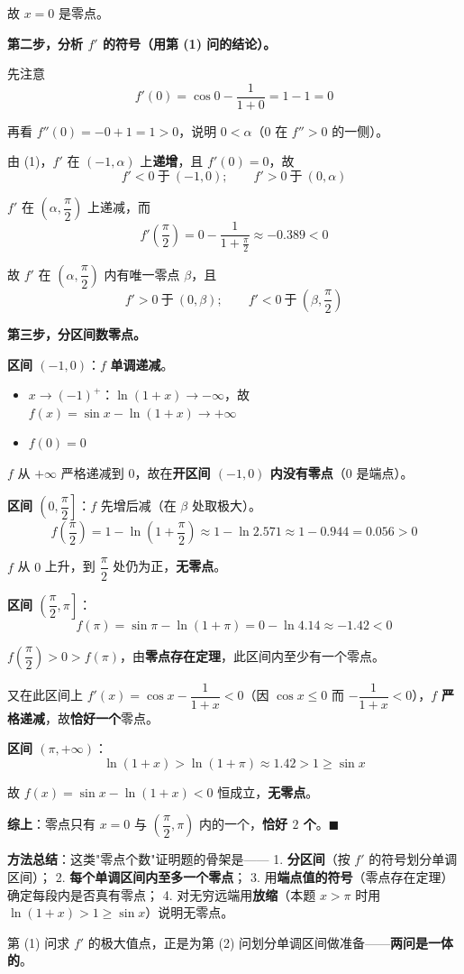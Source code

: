 故 $x=0$ 是零点。

\textbf{第二步，分析 $f'$ 的符号（用第 (1) 问的结论）。}

先注意
\[f'(0)=\cos0-\frac1{1+0}=1-1=0\]

再看 $f''(0)=-0+1=1>0$，说明 $0<\alpha$（$0$ 在 $f''>0$ 的一侧）。

由 (1)，$f'$ 在 $(-1,\alpha)$ 上\textbf{递增}，且 $f'(0)=0$，故
\[f'<0\ \text{于}\ (-1,0);\qquad f'>0\ \text{于}\ (0,\alpha)\]

$f'$ 在 $\left(\alpha,\dfrac\pi2\right)$ 上递减，而
\[f'\left(\frac\pi2\right)=0-\frac1{1+\frac\pi2}\approx-0.389<0\]

故 $f'$ 在 $\left(\alpha,\dfrac\pi2\right)$ 内有唯一零点 $\beta$，且
\[f'>0\ \text{于}\ (0,\beta);\qquad f'<0\ \text{于}\ \left(\beta,\frac\pi2\right)\]

\textbf{第三步，分区间数零点。}

\textbf{区间 $(-1,0)$}：$f$ \textbf{单调递减}。
\begin{itemize}
\item $x\to(-1)^{+}$：$\ln(1+x)\to-\infty$，故 $f(x)=\sin x-\ln(1+x)\to+\infty$
\item $f(0)=0$
\end{itemize}

$f$ 从 $+\infty$ 严格递减到 $0$，故在\textbf{开区间 $(-1,0)$ 内没有零点}（$0$ 是端点）。

\textbf{区间 $\left(0,\dfrac\pi2\right]$}：$f$ 先增后减（在 $\beta$ 处取极大）。
\[f\left(\frac\pi2\right)=1-\ln\left(1+\frac\pi2\right)\approx1-\ln2.571\approx1-0.944=0.056>0\]

$f$ 从 $0$ 上升，到 $\dfrac\pi2$ 处仍为正，\textbf{无零点}。

\textbf{区间 $\left(\dfrac\pi2,\pi\right]$}：
\[f(\pi)=\sin\pi-\ln(1+\pi)=0-\ln4.14\approx-1.42<0\]

$f\left(\dfrac\pi2\right)>0>f(\pi)$，由\textbf{零点存在定理}，此区间内至少有一个零点。

又在此区间上 $f'(x)=\cos x-\dfrac1{1+x}<0$（因 $\cos x\le0$ 而 $-\dfrac1{1+x}<0$），$f$ \textbf{严格递减}，故\textbf{恰好一个}零点。

\textbf{区间 $(\pi,+\infty)$}：
\[\ln(1+x)>\ln(1+\pi)\approx1.42>1\ge\sin x\]

故 $f(x)=\sin x-\ln(1+x)<0$ 恒成立，\textbf{无零点}。

\textbf{综上}：零点只有 $x=0$ 与 $\left(\dfrac\pi2,\pi\right)$ 内的一个，\textbf{恰好 $2$ 个}。$\blacksquare$

\begin{gktip}
\textbf{方法总结}：这类"零点个数"证明题的骨架是——
1. \textbf{分区间}（按 $f'$ 的符号划分单调区间）；
2. \textbf{每个单调区间内至多一个零点}；
3. 用\textbf{端点值的符号}（零点存在定理）确定每段内是否真有零点；
4. 对无穷远端用\textbf{放缩}（本题 $x>\pi$ 时用 $\ln(1+x)>1\ge\sin x$）说明无零点。

第 (1) 问求 $f'$ 的极大值点，正是为第 (2) 问划分单调区间做准备——\textbf{两问是一体的}。
\end{gktip}

